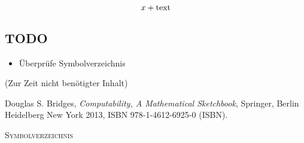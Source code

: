 \documentclass[a4paper]{amsart}
\theoremstyle{definition}
\begin{document}
\begin{equation}
   x + \hbox{text}
\end{equation}

\begin{backup}
\section{TODO}
\begin{itemize}
     \item Überprüfe Symbolverzeichnis
\end{itemize}


\end{backup}

\begin{backup}
    (Zur Zeit nicht benötigter Inhalt)
\end{backup}

\begin{thebibliography}{9}
   Douglas S. Bridges, \emph{Computability, A Mathematical Sketchbook},
   Springer, Berlin Heidelberg New York 2013, ISBN 978-1-4612-6925-0 (ISBN).

\end{thebibliography}

\begin{large}
    \centerline{\textsc{Symbolverzeichnis}}
\end{large}
\bigskip
\end{document}
